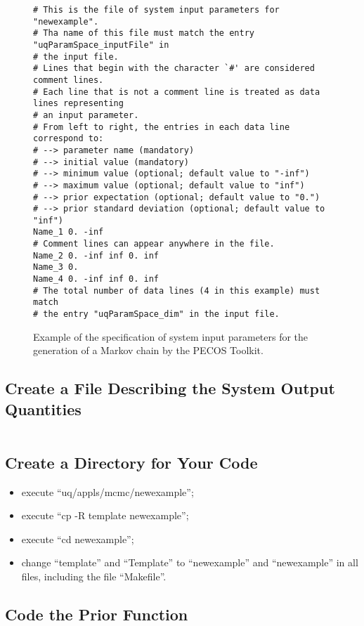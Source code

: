 \begin{figure}[h!]
\begin{verbatim}
# This is the file of system input parameters for "newexample".
# Tha name of this file must match the entry "uqParamSpace_inputFile" in
# the input file.
# Lines that begin with the character `#' are considered comment lines.
# Each line that is not a comment line is treated as data lines representing
# an input parameter.
# From left to right, the entries in each data line correspond to:
# --> parameter name (mandatory)
# --> initial value (mandatory)
# --> minimum value (optional; default value to "-inf")
# --> maximum value (optional; default value to "inf")
# --> prior expectation (optional; default value to "0.")
# --> prior standard deviation (optional; default value to "inf")
Name_1 0. -inf
# Comment lines can appear anywhere in the file.
Name_2 0. -inf inf 0. inf
Name_3 0.
Name_4 0. -inf inf 0. inf
# The total number of data lines (4 in this example) must match
# the entry "uqParamSpace_dim" in the input file.
\end{verbatim}
\caption{Example of the specification of system input parameters for the generation of a Markov chain by the PECOS Toolkit.
}
\label{fig-dram-par-file-ex}
\end{figure}

\subsection{Create a File Describing the System Output Quantities}\label{subsc-gmc-eight-steps-sys-output-quantities}
$~$\\

\subsection{Create a Directory for Your Code}\label{subsc-gmc-eight-steps-myexample}

\begin{itemize}
\item execute ``uq/appls/mcmc/newexample'';
\item execute ``cp -R template newexample'';
\item execute ``cd newexample'';
\item change ``template'' and ``Template'' to ``newexample'' and ``newexample'' in all files, including the file ``Makefile''.
\end{itemize}

\subsection{Code the Prior Function}\label{subsc-gmc-eight-steps-prior-code}

